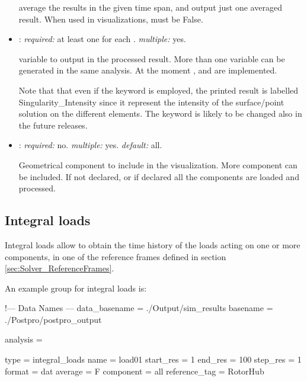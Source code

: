 \begin{itemize}
average the results in the given time span, and output just one averaged result. When used in visualizations,  must be False.

\item {}: \textit{required:} at least one for each . \textit{multiple:} yes.

variable to output in the processed result. More than one variable can be generated in the same analysis. At the moment ,  and  are implemented.

Note that that even if the keyword  is employed, the printed result is labelled Singularity\_Intensity since it represent the intensity of the surface/point solution on the different elements. The keyword is likely to be changed also in the future releases.

\item {}: \textit{required:} no. \textit{multiple:} yes. \textit{default:} all.

Geometrical component to include in the visualization. More component can be included. If not declared, or if declared  all the components are loaded and processed. 
\end{itemize}

\subsection{Integral loads}

Integral loads allow to obtain the time history of the loads acting on one or more components, in one of the reference frames defined in section \ref{sec:Solver_ReferenceFrames}.

An example  group for integral loads is:

\begin{inputfile}[frame=single, caption={dust\_post.in for integral loads}, label={file:dust_post.in_load}]
!--- Data Names ---
data_basename = ./Output/sim_results
basename =     ./Postpro/postpro_output

analysis = {

type = integral_loads
name = load01
start_res = 1
end_res   = 100 
step_res  = 1
format = dat
average = F
component = all
reference_tag = RotorHub

}
\end{inputfile}

